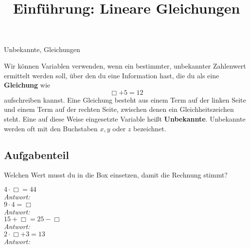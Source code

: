 \documentclass{uebungsblatt}
\title{Einführung: Lineare Gleichungen}
\begin{document}
\maketitle
\begin{contents}
    Unbekannte, Gleichungen
\end{contents}


\begin{remark}
    Wir können Variablen verwenden, wenn ein bestimmter, unbekannter Zahlenwert ermittelt werden soll, über den du eine Information hast, die du als eine \textbf{Gleichung} wie
    \[\Box+5=12\]
    aufschreiben kannst. Eine Gleichung besteht aus einem Term auf der linken Seite und einem Term auf der rechten Seite, zwischen denen ein Gleichheitszeichen steht. Eine auf diese Weise eingesetzte Variable heißt \textbf{Unbekannte}. Unbekannte werden oft mit den Buchstaben $x,y$ oder $z$ bezeichnet.
\end{remark}

\subsection*{Aufgabenteil}

\begin{exercise}
    Welchen Wert musst du in die Box einsetzen, damit die Rechnung stimmt?
    \begin{multicols}{4}
        $4\cdot\Box=44$\\\emph{Antwort:} \\
        $9\cdot4=\Box$\\\emph{Antwort:} \\
        $15+\Box=25-\Box$\\\emph{Antwort:} \\
        $2\cdot\Box+3=13$\\\emph{Antwort:} 
    \end{multicols}
\end{exercise}
\end{document}
